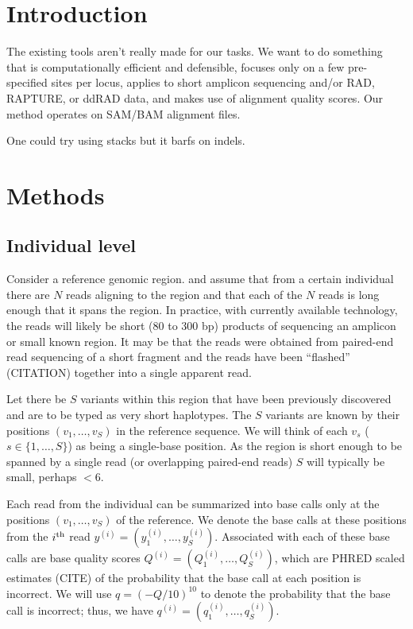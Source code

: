 
\section*{Introduction}

The existing tools aren't really made for our tasks.  We want to do something that
is computationally efficient and defensible, focuses only on a few pre-specified sites per 
locus, applies to short amplicon sequencing and/or RAD, RAPTURE, or ddRAD data, and 
makes use of alignment quality scores.  Our method operates on SAM/BAM alignment files.

One could try using {\sc stacks} but it barfs on indels.
\section*{Methods}
\subsection*{Individual level}
Consider a reference genomic region. 
and assume that from a certain individual there are $N$ reads aligning to the region
and that each of the $N$ reads is 
long enough that it spans the region. In practice,
with currently available technology, the reads will likely be short
(80 to 300 bp) products of sequencing an amplicon or small known region. It may be that the 
reads were obtained from paired-end read sequencing of a short
fragment and the reads have been
``flashed'' (CITATION) together into a single apparent read.

Let there be $S$ variants 
within this region that have been previously discovered and
are to be typed as very short haplotypes.  
The $S$ variants are known by their positions $(v_1,\ldots,v_S)$ in the reference sequence.
We will think of each $v_s$ ($s \in \{1,\ldots,S\}$) as being a single-base 
position. As the region is short enough to be spanned by a single read (or overlapping 
paired-end reads)  $S$ will typically be small, perhaps $<6$. 

Each read from the individual can be summarized into base calls only at
the positions $(v_1,\ldots,v_S)$ of the reference. We denote the base calls at these 
positions from the $i^\mathrm{th}$ read $y^{(i)} = (y^{(i)}_1, \ldots, y^{(i)}_S)$.  Associated with
each of these base calls are base quality scores 
$Q^{(i)} = (Q^{(i)}_1, \ldots, Q^{(i)}_S)$, which are
PHRED scaled estimates (CITE) of the probability that the base call at each position is incorrect.
We will use $q = (-Q/10)^{10}$ to denote the probability that the base call is incorrect; thus,
 we have $q^{(i)} = (q^{(i)}_1, \ldots, q^{(i)}_S)$. 
 
